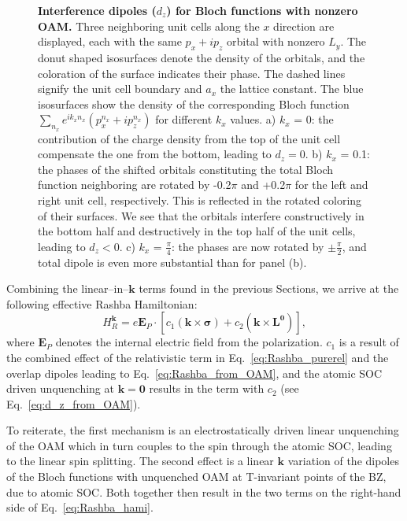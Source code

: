 \begin{figure}
	\centering
{}
\caption{\label{fig:Rashba_interference}{\bf Interference dipoles ($d_z$) for Bloch functions with nonzero \gls{OAM}.} Three neighboring unit cells along the $x$ direction are displayed, each with the same $p_x + ip_z$ orbital with nonzero $L_y$. The donut shaped isosurfaces denote the density of the orbitals, and the coloration of the surface indicates their phase. The dashed lines signify the unit cell boundary and $a_x$ the lattice constant. The blue isosurfaces show the density of the corresponding Bloch function $\sum_{n_x} e^{i k_x n_x} (p_x^{n_x} + ip_z^{n_x})$ for different $k_x$ values.
a) $k_x$ = 0: the contribution of the charge density from the top of the unit cell compensate the one from the bottom, leading to $d_z=0$.
b) $k_x$ = 0.1: the phases of the shifted orbitals constituting the total Bloch function neighboring are rotated by -0.2$\pi$ and +0.2$\pi$ for the left and right unit cell, respectively. This is reflected in the rotated coloring of their surfaces. We see that the orbitals interfere constructively in the bottom half and destructively in the top half of the unit cells, leading to $d_z<0$.
c) $k_x$ = $\frac{\pi}{4}$: the phases are now rotated by $\pm \frac{\pi}{2}$, and total dipole is even more substantial than for panel (b).}
\end{figure}
    
Combining the linear--in--$\bm k$ terms found in the previous Sections, we arrive at the following effective Rashba Hamiltonian:
\begin{equation}
	\label{eq:Rashba_hami}
	H_R^{\bm k} = e \bm{E}_P\cdot \left[c_1(\bm k \times \bm \sigma) + c_2 (\bm k \times \bm{L}^{\bm 0} ) \right],
\end{equation}
where $\bm{E}_P$ denotes the internal electric field from the polarization.
$c_1$ is a result of the combined effect of the relativistic term in Eq.~\eqref{eq:Rashba_purerel} and the overlap dipoles leading to Eq.~\eqref{eq:Rashba_from_OAM}, and the atomic \gls{SOC} driven unquenching at $\bm k = \bm 0$ results in the term with $c_2$ (see Eq.~\eqref{eq:d_z_from_OAM}).

To reiterate, the first mechanism is an electrostatically driven linear unquenching of the \gls{OAM} which in turn couples to the spin through the atomic \gls{SOC}, leading to the linear spin splitting.
The second effect is a linear $\bm k$ variation of the dipoles of the Bloch functions with unquenched \gls{OAM} at \gls{T}-invariant points of the \gls{BZ}, due to atomic \gls{SOC}. Both together then result in the two terms on the right-hand side of Eq.~\eqref{eq:Rashba_hami}. 
    
